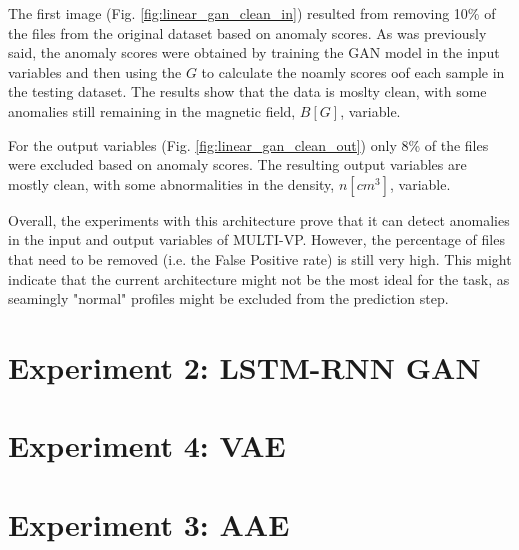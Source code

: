 The first image (Fig. \ref{fig:linear_gan_clean_in}) resulted from removing 10\% of the files from the original dataset based on anomaly scores. As was previously said, the anomaly scores were obtained by training the GAN model in the input variables and then using the $G$ to calculate the noamly scores oof each sample in the testing dataset. The results show that the data is moslty clean, with some anomalies still remaining in the magnetic field, $B [G]$, variable.

For the output variables (Fig. \ref{fig:linear_gan_clean_out}) only 8\% of the files were excluded based on anomaly scores. The resulting output variables are mostly clean, with some abnormalities in the density, $n [cm^3]$, variable.

Overall, the experiments with this architecture prove that it can detect anomalies in the input and output variables of MULTI-VP. However, the percentage of files that need to be removed (i.e. the False Positive rate) is still very high. This might indicate that the current architecture might not be the most ideal for the task, as seamingly "normal" profiles might be excluded from the prediction step.










\section{Experiment 2: LSTM-RNN GAN}\label{sec:gan_experiment_2}
\section{Experiment 4: VAE}\label{sec:mad-gan}
\section{Experiment 3: AAE}\label{sec:gan_experiment_3}

